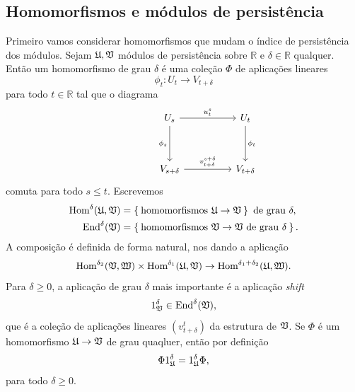 \subsection{Homomorfismos e módulos de persistência}

Primeiro vamos considerar homomorfismos que mudam o índice de persistência dos módulos. 
Sejam $\mathfrak{U}, \mathfrak{V}$ módulos de persistência sobre $\mathbb{R}$ e $\delta \in \mathbb{R}$
qualquer. Então um homomorfismo de grau $\delta$ é uma coleção $\Phi$ de aplicações lineares
\begin{equation*}
    \phi_t \colon U_t \to V_{t+\delta}
\end{equation*}
para todo $t \in \mathbb{R}$ tal que o diagrama 
\begin{equation*}
    \begin{tikzcd}[row sep=huge, column sep = huge]
        & U_s \rar{u_t^s} \dar[swap]{\phi_s} & U_t \dar{\phi_t} \\
        & V_{s+\delta} \rar{v^{s+\delta}_{t+\delta}} & V_{t+\delta}
    \end{tikzcd}
\end{equation*}
comuta para todo $s \leq t$. Escrevemos 
\begin{align*}
    \text{Hom}^\delta(\mathfrak{U}, \mathfrak{V}) &= \Set{\text{homomorfismos } \mathfrak{U} \to \mathfrak{V}}
    \text{ de grau } \delta, \\
    \text{End}^\delta(\mathfrak{V}) &= \Set{\text{homomorfismos } \mathfrak{V} \to \mathfrak{V}\text{ de grau } \delta}.
\end{align*}
A composição é definida de forma natural, nos dando a aplicação
\begin{equation*}
    \text{Hom}^{\delta_2}(\mathfrak{V}, \mathfrak{W}) \times \text{Hom}^{\delta_1}(\mathfrak{U}, \mathfrak{V}) 
    \to \text{Hom}^{\delta_1 + \delta_2}(\mathfrak{U}, \mathfrak{W}).
\end{equation*}
Para $\delta \geq 0$, a aplicação de grau $\delta$ mais importante é a aplicação
\textit{shift}
\begin{equation*}
    1^\delta_{\mathfrak{V}} \in\text{End}^\delta(\mathfrak{V}),
\end{equation*}
que é a coleção de aplicações lineares $(v_{t+\delta}^t)$ da estrutura de $\mathfrak{V}$. Se $\Phi$ 
é um homomorfismo $\mathfrak{U} \to \mathfrak{V}$ de grau quaqluer, então por definição 
\begin{equation*}
    \Phi 1_{\mathfrak{U}}^\delta = 1_{\mathfrak{U}}^\delta \Phi,
\end{equation*}
para todo $\delta \geq 0$. 

